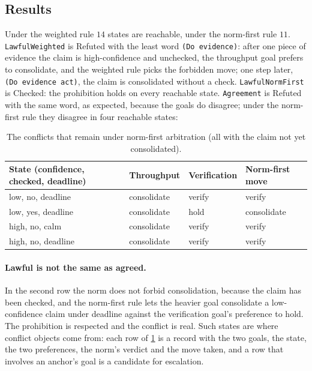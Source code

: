 \documentclass[11pt]{article}
\newcommand{\code}[1]{\texttt{#1}}
\theoremstyle{definition}
\theoremstyle{plain}
\begin{document}
\subsection{Results}

Under the weighted rule $14$ states are reachable, under the norm-first rule $11$.
\code{LawfulWeighted} is Refuted with the least word \code{(Do evidence)}: after one piece of
evidence the claim is high-confidence and unchecked, the throughput goal prefers to consolidate, and
the weighted rule picks the forbidden move; one step later, \code{(Do evidence act)}, the claim is
consolidated without a check. \code{LawfulNormFirst} is Checked: the prohibition holds on every
reachable state. \code{Agreement} is Refuted with the same word, as expected, because the goals do
disagree; under the norm-first rule they disagree in four reachable states:

\begin{table}[ht]
\centering\small
\begin{tabular}{llll}
\toprule
State (confidence, checked, deadline) & Throughput & Verification & Norm-first move\\
\midrule
low, no, deadline & consolidate & verify & verify\\
low, yes, deadline & consolidate & hold & consolidate\\
high, no, calm & consolidate & verify & verify\\
high, no, deadline & consolidate & verify & verify\\
\bottomrule
\end{tabular}
\caption{The conflicts that remain under norm-first arbitration (all with the claim not yet
consolidated).}\label{tab:p6}
\end{table}

\paragraph{Lawful is not the same as agreed.} In the second row the norm does not forbid
consolidation, because the claim has been checked, and the norm-first rule lets the heavier goal
consolidate a low-confidence claim under deadline against the verification goal's preference to
hold. The prohibition is respected and the conflict is real. Such states are where conflict objects
come from: each row of \cref{tab:p6} is a record with the two goals, the state, the two preferences,
the norm's verdict and the move taken, and a row that involves an anchor's goal is a candidate for
escalation.
\end{document}

